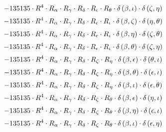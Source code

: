 \begin{subequations}
\begin{gather}
 \\[0.2em] \notag 		 - 135135 \cdot R^{4} \cdot R_{\alpha{}} \cdot R_{\gamma{}} \cdot R_{\delta{}} \cdot R_{\epsilon{}} \cdot R_{\theta{}} \cdot \delta{}\left(\beta{}, \iota{}\right) \cdot \delta{}\left(\zeta{}, \eta{}\right) 
 \\[0.2em] \notag 		 - 135135 \cdot R^{4} \cdot R_{\alpha{}} \cdot R_{\gamma{}} \cdot R_{\delta{}} \cdot R_{\epsilon{}} \cdot R_{\iota{}} \cdot \delta{}\left(\beta{}, \zeta{}\right) \cdot \delta{}\left(\eta{}, \theta{}\right) 
 \\[0.2em] \notag 		 - 135135 \cdot R^{4} \cdot R_{\alpha{}} \cdot R_{\gamma{}} \cdot R_{\delta{}} \cdot R_{\epsilon{}} \cdot R_{\iota{}} \cdot \delta{}\left(\beta{}, \eta{}\right) \cdot \delta{}\left(\zeta{}, \theta{}\right) 
 \\[0.2em] \notag 		 - 135135 \cdot R^{4} \cdot R_{\alpha{}} \cdot R_{\gamma{}} \cdot R_{\delta{}} \cdot R_{\epsilon{}} \cdot R_{\iota{}} \cdot \delta{}\left(\beta{}, \theta{}\right) \cdot \delta{}\left(\zeta{}, \eta{}\right) 
 \\[0.2em] \notag 		 - 135135 \cdot R^{4} \cdot R_{\alpha{}} \cdot R_{\gamma{}} \cdot R_{\delta{}} \cdot R_{\zeta{}} \cdot R_{\eta{}} \cdot \delta{}\left(\beta{}, \epsilon{}\right) \cdot \delta{}\left(\theta{}, \iota{}\right) 
 \\[0.2em] \notag 		 - 135135 \cdot R^{4} \cdot R_{\alpha{}} \cdot R_{\gamma{}} \cdot R_{\delta{}} \cdot R_{\zeta{}} \cdot R_{\eta{}} \cdot \delta{}\left(\beta{}, \theta{}\right) \cdot \delta{}\left(\epsilon{}, \iota{}\right) 
 \\[0.2em] \notag 		 - 135135 \cdot R^{4} \cdot R_{\alpha{}} \cdot R_{\gamma{}} \cdot R_{\delta{}} \cdot R_{\zeta{}} \cdot R_{\eta{}} \cdot \delta{}\left(\beta{}, \iota{}\right) \cdot \delta{}\left(\epsilon{}, \theta{}\right) 
 \\[0.2em] \notag 		 - 135135 \cdot R^{4} \cdot R_{\alpha{}} \cdot R_{\gamma{}} \cdot R_{\delta{}} \cdot R_{\zeta{}} \cdot R_{\theta{}} \cdot \delta{}\left(\beta{}, \epsilon{}\right) \cdot \delta{}\left(\eta{}, \iota{}\right) 
 \\[0.2em] \notag 		 - 135135 \cdot R^{4} \cdot R_{\alpha{}} \cdot R_{\gamma{}} \cdot R_{\delta{}} \cdot R_{\zeta{}} \cdot R_{\theta{}} \cdot \delta{}\left(\beta{}, \eta{}\right) \cdot \delta{}\left(\epsilon{}, \iota{}\right) 
 \\[0.2em] \notag 		 - 135135 \cdot R^{4} \cdot R_{\alpha{}} \cdot R_{\gamma{}} \cdot R_{\delta{}} \cdot R_{\zeta{}} \cdot R_{\theta{}} \cdot \delta{}\left(\beta{}, \iota{}\right) \cdot \delta{}\left(\epsilon{}, \eta{}\right) 

\end{gather}
\end{subequations}
